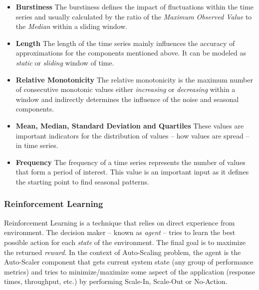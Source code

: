 \begin{itemize}
    \item \textbf{Burstiness} The burstiness defines the impact of fluctuations within the time series and usually calculated by the ratio of the \emph{Maximum Observed Value} to the \emph{Median} within a sliding
    window.
    \item \textbf{Length} The length of the time series mainly influences the accuracy of approximations for the components mentioned above. It can be modeled as \emph{static} or \emph{sliding} window of time.
    \item \textbf{Relative Monotonicity} The relative monotonicity is the maximum number of consecutive monotonic values either \emph{increasing} or \emph{decreasing} within a window and indirectly determines the influence of the noise and seasonal components.
    \item \textbf{Mean, Median, Standard Deviation and Quartiles} These values are important indicators for the distribution of values -- how values are spread -- in time series.
    \item \textbf{Frequency} The frequency of a time series represents the number of values that form a period of interest. This value is an important input as it defines the starting point to find seasonal patterns.
\end{itemize}
\subsubsection{Reinforcement Learning}
Reinforcement Learning is a technique that relies on direct experience from environment. The decision maker -- known as \emph{agent} -- tries to learn the best possible action for each \emph{state} of the environment. The final goal is to maximize the returned \emph{reward}. In the context of Auto-Scaling problem, the agent is the Auto-Scaler component that gets current system state (any group of performance metrics) and tries to minimize/maximize some aspect of the application (response times, throughput, etc.) by performing Scale-In, Scale-Out or No-Action.

